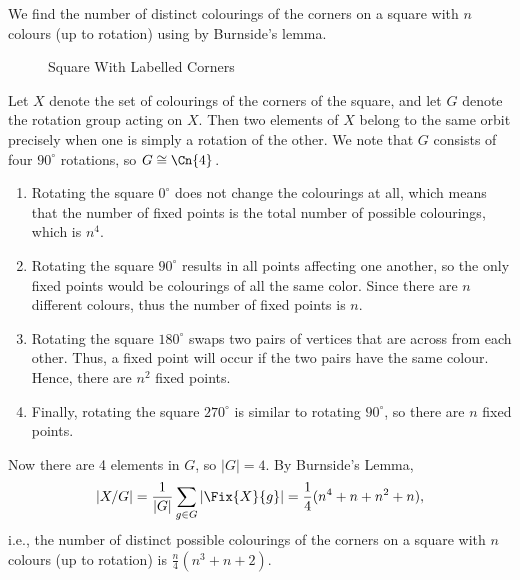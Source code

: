 \begin{example}
    We find the number of distinct colourings of the corners on a square with $n$ colours (up to rotation) using by Burnside's lemma.

    \begin{figure}[h]
	    \centering
	    \caption{Square With Labelled Corners}
	\end{figure}

    Let $X$ denote the set of colourings of the corners of the square, and let $G$ denote the rotation group acting on $X$. Then two elements of $X$ belong to the same orbit precisely when one is simply a rotation of the other. We note that $G$ consists of four $90^\circ$ rotations, so $G \cong \Cn{4}$.
    \begin{enumerate}
        \item Rotating the square $0^\circ$ does not change the colourings at all, which means that the number of fixed points is the total number of possible colourings, which is $n^4$.
        \item Rotating the square $90^\circ$ results in all points affecting one another, so the only fixed points would be colourings of all the same color. Since there are $n$ different colours, thus the number of fixed points is $n$.
        \item Rotating the square $180^\circ$ swaps two pairs of vertices that are across from each other. Thus, a fixed point will occur if the two pairs have the same colour. Hence, there are $n^2$ fixed points.
        \item Finally, rotating the square $270^\circ$ is similar to rotating $90^\circ$, so there are $n$ fixed points.
    \end{enumerate}
    Now there are 4 elements in $G$, so $|G| = 4$. By Burnside's Lemma,
    \[
        |X/G| = \frac{1}{|G|}\sum_{g\in G} |\Fix{X}{g}| = \frac14 (n^4 + n + n^2 + n),
    \]
    i.e., the number of distinct possible colourings of the corners on a square with $n$ colours (up to rotation) is $\frac n4 (n^3 + n + 2)$.
\end{example}

